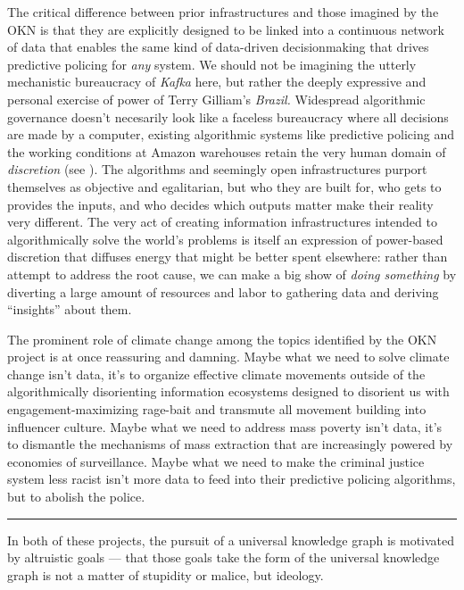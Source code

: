 The critical difference between prior infrastructures and those imagined
by the OKN is that they are explicitly designed to be linked into a
continuous network of data that enables the same kind of data-driven
decisionmaking that drives predictive policing for \emph{any} system. We
should not be imagining the utterly mechanistic bureaucracy of
\emph{Kafka} here, but rather the deeply expressive and personal
exercise of power of Terry Gilliam's \emph{Brazil.} Widespread
algorithmic governance doesn't necesarily look like a faceless
bureaucracy where all decisions are made by a computer, existing
algorithmic systems like predictive policing and the working conditions
at Amazon warehouses retain the very human domain of \emph{discretion}
(see \cite{hongPredictionExtractionDiscretion2022} ). The
algorithms and seemingly open infrastructures purport themselves as
objective and egalitarian, but who they are built for, who gets to
provides the inputs, and who decides which outputs matter make their
reality very different. The very act of creating information
infrastructures intended to algorithmically solve the world's problems
is itself an expression of power-based discretion that diffuses energy
that might be better spent elsewhere: rather than attempt to address the
root cause, we can make a big show of \emph{doing something} by
diverting a large amount of resources and labor to gathering data and
deriving ``insights'' about them.

The prominent role of climate change among the topics identified by the
OKN project is at once reassuring and damning. Maybe what we need to
solve climate change isn't data, it's to organize effective climate
movements outside of the algorithmically disorienting information
ecosystems designed to disorient us with engagement-maximizing rage-bait
and transmute all movement building into influencer culture. Maybe what
we need to address mass poverty isn't data, it's to dismantle the
mechanisms of mass extraction that are increasingly powered by economies
of surveillance. Maybe what we need to make the criminal justice system
less racist isn't more data to feed into their predictive policing
algorithms, but to abolish the police.

\begin{center}\rule{0.5\linewidth}{0.5pt}\end{center}

In both of these projects, the pursuit of a universal knowledge graph is
motivated by altruistic goals --- that those goals take the form of the
universal knowledge graph is not a matter of stupidity or malice, but
ideology.

